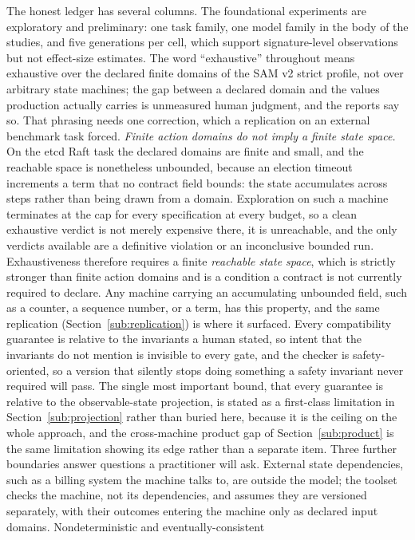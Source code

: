 \documentclass[11pt]{article}
\begin{document}
The honest ledger has several columns. The foundational experiments are
exploratory and preliminary: one task family, one model family in the body of
the studies, and five generations per cell, which support signature-level
observations but not effect-size estimates. The word ``exhaustive'' throughout
means exhaustive over the declared finite domains of the SAM v2 strict profile,
not over arbitrary state machines; the gap between a declared domain and the
values production actually carries is unmeasured human judgment, and the reports
say so. That phrasing needs one correction, which a replication on an external
benchmark task forced. \emph{Finite action domains do not imply a finite state
space.} On the etcd Raft task the declared domains are finite and small, and the
reachable space is nonetheless unbounded, because an election timeout increments
a term that no contract field bounds: the state accumulates across steps rather
than being drawn from a domain. Exploration on such a machine terminates at the
cap for every specification at every budget, so a clean exhaustive verdict is
not merely expensive there, it is unreachable, and the only verdicts available
are a definitive violation or an inconclusive bounded run. Exhaustiveness
therefore requires a finite \emph{reachable state space}, which is strictly
stronger than finite action domains and is a condition a contract is not
currently required to declare. Any machine carrying an accumulating unbounded
field, such as a counter, a sequence number, or a term, has this property, and
the same replication (Section~\ref{sub:replication}) is where it surfaced.
Every compatibility guarantee is relative to the invariants a human
stated, so intent that the invariants do not mention is invisible to every gate,
and the checker is safety-oriented, so a version that silently stops doing
something a safety invariant never required will pass. The single most important
bound, that every guarantee is relative to the observable-state projection, is
stated as a first-class limitation in Section~\ref{sub:projection} rather than buried here,
because it is the ceiling on the whole approach, and the cross-machine product
gap of Section~\ref{sub:product} is the same limitation showing its edge rather than a separate
item. Three further boundaries answer questions a practitioner will ask.
External state dependencies, such as a billing system the machine talks to, are
outside the model; the toolset checks the machine, not its dependencies, and
assumes they are versioned separately, with their outcomes entering the machine
only as declared input domains. Nondeterministic and eventually-consistent
\end{document}
